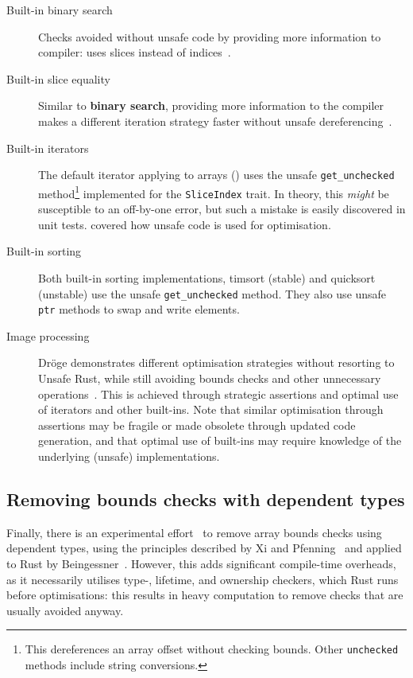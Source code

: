 \documentclass[dissertation.tex]{subfiles}
\begin{document}
\begin{description}
    \item[Built-in binary search] Checks avoided without unsafe code by
    providing more information to compiler: uses slices instead of
    indices~\cite{rust-pr-binarysearch}.
    \item[Built-in slice equality] Similar to \textbf{binary search},
    providing more information to the compiler makes a different
    iteration strategy faster without unsafe dereferencing~\cite{rust-pr-slice-partialeq}.
    \item[Built-in iterators] The default iterator applying to arrays
    () uses the unsafe
    \texttt{get\_unchecked} method\footnote{
        This dereferences an array offset without checking bounds.
        Other \texttt{unchecked} methods include string conversions.
    } implemented for the \texttt{SliceIndex} trait.
    In theory, this \emph{might} be susceptible to an off-by-one error,
    but such a mistake is easily discovered in unit tests.
     covered how unsafe code is used for
    optimisation.
    \item[Built-in sorting] Both built-in sorting implementations,
    timsort (stable) and quicksort (unstable) use the unsafe
    \texttt{get\_unchecked} method.
    They also use unsafe \texttt{ptr} methods to swap and write
    elements.
    \item[Image processing] Dr\"oge demonstrates different optimisation
    strategies without resorting to Unsafe Rust, while still avoiding
    bounds checks and other unnecessary operations~\cite{droge-opt}.
    This is achieved through strategic assertions and optimal use of
    iterators and other built-ins.
    Note that similar optimisation through assertions may be fragile or
    made obsolete through updated code generation, and that optimal use
    of built-ins may require knowledge of the underlying (unsafe)
    implementations.
\end{description}

\subsection{Removing bounds checks with dependent types}
Finally, there is an experimental effort~\cite{rust-crate-indexing} to
remove array bounds checks using dependent types, using the principles
described by Xi and Pfenning~\cite{xi-pfenning-dependent} and applied to
Rust by Beingessner~\cite{beingessner}.
However, this adds significant compile-time overheads, as it necessarily
utilises type-, lifetime, and ownership checkers, which Rust runs before
optimisations: this results in heavy computation to remove checks that
are usually avoided anyway.
\end{document}
